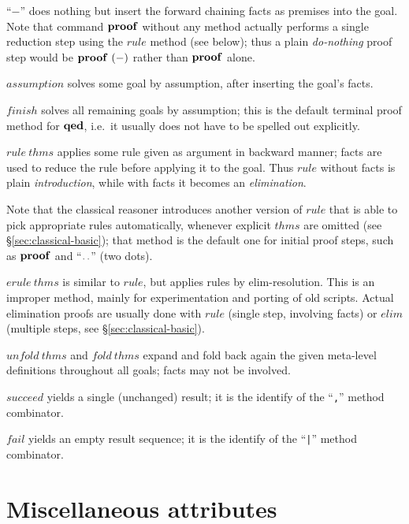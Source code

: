 \begin{descr}
\item [``$-$''] does nothing but insert the forward chaining facts as premises
  into the goal.  Note that command ${\mathord{\mathbf{proof}}}$ without any method actually
  performs a single reduction step using the $rule$ method (see below); thus a
  plain \emph{do-nothing} proof step would be $\PROOF{-}$ rather than
  ${\mathord{\mathbf{proof}}}$ alone.
\item [$assumption$] solves some goal by assumption, after inserting the
  goal's facts.
\item [$finish$] solves all remaining goals by assumption; this is the default
  terminal proof method for ${\mathord{\mathbf{qed}}}$, i.e.\ it usually does not have to be
  spelled out explicitly.
\item [$rule~thms$] applies some rule given as argument in backward manner;
  facts are used to reduce the rule before applying it to the goal.  Thus
  $rule$ without facts is plain \emph{introduction}, while with facts it
  becomes an \emph{elimination}.
  
  Note that the classical reasoner introduces another version of $rule$ that
  is able to pick appropriate rules automatically, whenever explicit $thms$
  are omitted (see \S\ref{sec:classical-basic}); that method is the default
  one for initial proof steps, such as ${\mathord{\mathbf{proof}}}$ and ``${\mathord{\mathbf{.\,.}}}$'' (two
  dots).
\item [$erule~thms$] is similar to $rule$, but applies rules by
  elim-resolution.  This is an improper method, mainly for experimentation and
  porting of old scripts.  Actual elimination proofs are usually done with
  $rule$ (single step, involving facts) or $elim$ (multiple steps, see
  \S\ref{sec:classical-basic}).
\item [$unfold~thms$ and $fold~thms$] expand and fold back again the given
  meta-level definitions throughout all goals; facts may not be involved.
\item [$succeed$] yields a single (unchanged) result; it is the identify of
  the ``\texttt{,}'' method combinator.
\item [$fail$] yields an empty result sequence; it is the identify of the
  ``\texttt{|}'' method combinator.
\end{descr}


\section{Miscellaneous attributes}

